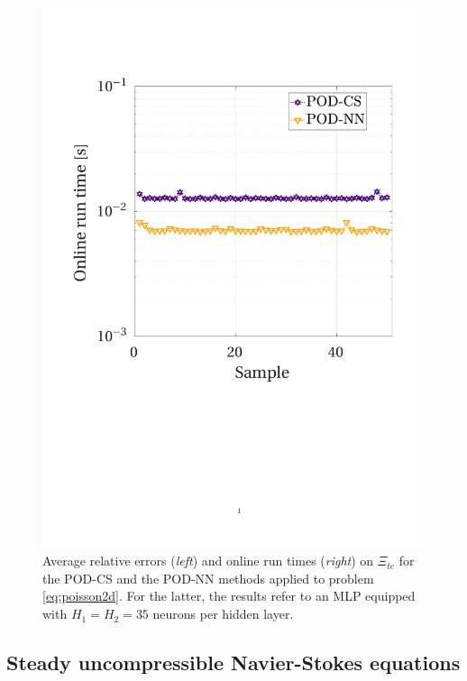 \documentclass{elsarticle}
\numberwithin{equation}{section}
\theoremstyle{theorem}
\theoremstyle{definition}
\theoremstyle{remark}
\theoremstyle{proposition}
\numberwithin{figure}{section}
\begin{document}
\begin{figure}[t!]
			\includegraphics[scale = 0.372, trim = {1.5cm 8.9cm 1.5cm 3.8cm}, clip]{poisson2d_3_cs_time}
			
			\vspace*{-0.2cm}
			
			\caption{Average relative errors (\emph{left}) and online run times (\emph{right}) on $\Xi_{te}$ for the POD-CS and the POD-NN methods applied to problem \eqref{eq:poisson2d}. For the latter, the results refer to an MLP equipped with $H_1 = H_2 = 35$ neurons per hidden layer.}
			\label{fig:poisson2d-fig5}
		\end{figure}
		
		
		
	\subsection{Steady uncompressible Navier-Stokes equations}
	\label{section:Steady uncompressible Navier-Stokes equations}
	
\end{document}
